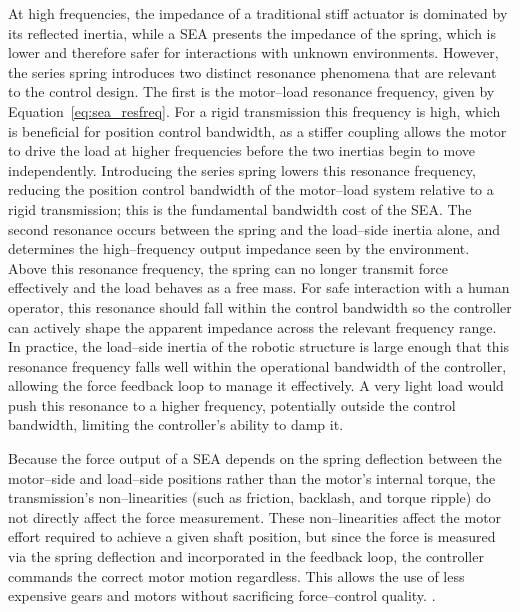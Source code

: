 \documentclass[11pt,a4paper,twoside,openright]{book}
\begin{document}
At high frequencies, the impedance of a traditional stiff actuator is dominated by its reflected inertia, while a SEA presents the impedance of the spring, which is lower and therefore safer for interactions with unknown environments. However, the series spring introduces two distinct resonance phenomena that are relevant to the control design. The first is the motor--load resonance frequency, given by Equation~\ref{eq:sea_resfreq}. For a rigid transmission this frequency is high, which is beneficial for position control bandwidth, as a stiffer coupling allows the motor to drive the load at higher frequencies before the two inertias begin to move independently. Introducing the series spring lowers this resonance frequency, reducing the position control bandwidth of the motor--load system relative to a rigid transmission; this is the fundamental bandwidth cost of the SEA. The second resonance occurs between the spring and the load--side inertia alone, and determines the high--frequency output impedance seen by the environment. Above this resonance frequency, the spring can no longer transmit force effectively and the load behaves as a free mass. For safe interaction with a human operator, this resonance should fall within the control bandwidth so the controller can actively shape the apparent impedance across the relevant frequency range. In practice, the load--side inertia of the robotic structure is large enough that this resonance frequency falls well within the operational bandwidth of the controller, allowing the force feedback loop to manage it effectively. A very light load would push this resonance to a higher frequency, potentially outside the control bandwidth, limiting the controller's ability to damp it.

Because the force output of a SEA depends on the spring deflection between the motor--side and load--side positions rather than the motor's internal torque, the transmission's non--linearities (such as friction, backlash, and torque ripple) do not directly affect the force measurement. These non--linearities affect the motor effort required to achieve a given shaft position, but since the force is measured via the spring deflection and incorporated in the feedback loop, the controller commands the correct motor motion regardless. This allows the use of less expensive gears and motors without sacrificing force--control quality. \cite{prattSeriesElasticActuators1995, prattSeriesElasticActuators2002, huResearchVariableImpedance2025b, yuLearningElasticitySeriesElastic2017,hurst}.
\newpage
\end{document}
